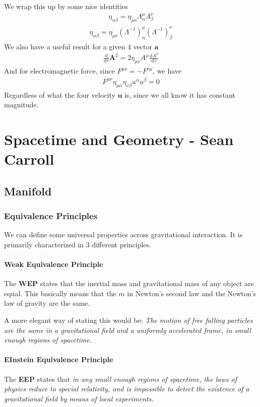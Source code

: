 \documentclass[11pt,letterpaper]{book}
\newcommand{\dydx}[2]{\frac{\text{d} #1}{\text{d} #2}}
\newcommand{\paren}[1]{\left( #1 \right)}
\newcommand{\etensor}[3]{#1_{#3}^{#2}}
\begin{document}
We wrap this up by some nice identities
\begin{align}
\eta_{\alpha\beta}=\eta_{\mu\nu}\etensor{\Lambda}{\mu}{\alpha}\etensor{\Lambda}{\nu}{\beta}
\end{align}
\begin{align}
\eta_{\alpha\beta}=\eta_{\mu\nu}\etensor{\paren{\Lambda^{-1}}}{\mu}{\alpha}\etensor{\paren{\Lambda^{-1}}}{\nu}{\beta}
\end{align}
We also have a useful result for a given 4 vector $\mathbf{a}$
\begin{align}
\dydx{}{\tau}\mathbf{A}^2 = 2\eta_{\mu\nu}A^{\mu}\dydx{A^{\nu}}{\tau}
\end{align}
And for electromagnetic force, since $F^{\mu\nu} = -F^{\nu\mu}$, we have
\begin{align}
F^{\mu\nu}\eta_{\mu\alpha}\eta_{\nu\beta}u^{\alpha}u^{\beta} = 0
\end{align}
Regardless of what the four velocity $\mathbf{u}$ is, since we all know it has constant magnitude. 


\chapter{Spacetime and Geometry - Sean Carroll}
\section{Manifold}
\subsection{Equivalence Principles}
We can define some universal properties across gravitational interaction. It is primarily characterized in 3 different principles.
\subsubsection{Weak Equivalence Principle}
The \textbf{WEP} states that the inertial mass and gravitational mass of any object are equal. This basically means that the $m$ in Newton's second law and the Newton's law of gravity are the same.

A more elegant way of stating this would be: \textit{The motion of free falling particles are the same in a gravitational field and a uniformly accelerated frame, in small enough regions of spacetime.}

\subsubsection{EInstein Equivalence Principle}
The \textbf{EEP} states that \textit{in any small enough regions of spacetime, the laws of physics reduce to special relativity, and is impossible to detect the existence of a gravitational field by means of local experiments.}
\end{document}
